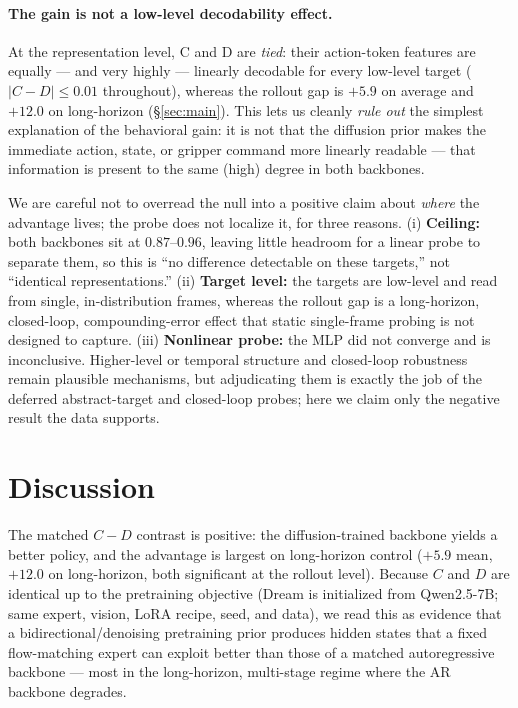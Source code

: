 \documentclass{article}
\begin{document}
\paragraph{The gain is not a low-level decodability effect.} At the representation
level, C and D are \emph{tied}: their action-token features are equally --- and
very highly --- linearly decodable for every low-level target ($|C-D|\le0.01$
throughout), whereas the rollout gap is $+5.9$ on average and $+12.0$ on
long-horizon (\S\ref{sec:main}). This lets us cleanly \emph{rule out} the simplest
explanation of the behavioral gain: it is not that the diffusion prior makes the
immediate action, state, or gripper command more linearly readable --- that
information is present to the same (high) degree in both backbones.

We are careful not to overread the null into a positive claim about \emph{where}
the advantage lives; the probe does not localize it, for three reasons. (i)
\textbf{Ceiling:} both backbones sit at $0.87$--$0.96$, leaving little headroom for
a linear probe to separate them, so this is ``no difference detectable on these
targets,'' not ``identical representations.'' (ii) \textbf{Target level:} the
targets are low-level and read from single, in-distribution frames, whereas the
rollout gap is a long-horizon, closed-loop, compounding-error effect that static
single-frame probing is not designed to capture. (iii) \textbf{Nonlinear probe:}
the MLP did not converge and is inconclusive. Higher-level or temporal structure
and closed-loop robustness remain plausible mechanisms, but adjudicating them is
exactly the job of the deferred abstract-target and closed-loop probes; here we
claim only the negative result the data supports.

\section{Discussion}

The matched $C-D$ contrast is positive: the diffusion-trained backbone yields a
better policy, and the advantage is largest on long-horizon control
($+5.9$ mean, $+12.0$ on long-horizon, both significant at the rollout level). Because $C$ and $D$ are identical up to
the pretraining objective (Dream is initialized from Qwen2.5-7B; same expert,
vision, LoRA recipe, seed, and data), we read this as evidence that a
bidirectional/denoising pretraining prior produces hidden states that a fixed
flow-matching expert can exploit better than those of a matched autoregressive
backbone --- most in the long-horizon, multi-stage regime where the AR backbone
degrades.
\end{document}
